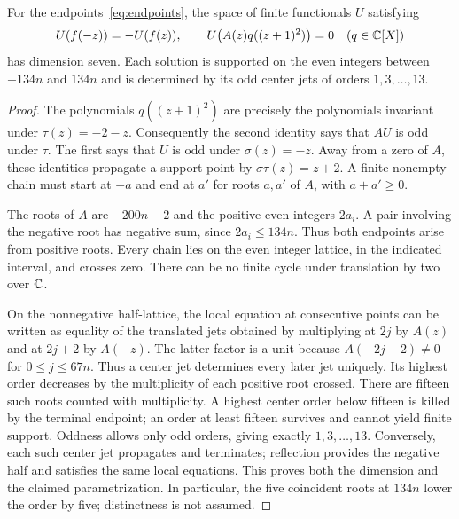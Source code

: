 \begin{proposition}\label{prop:finite-classification}
For the endpoints~\eqref{eq:endpoints}, the space of finite functionals $U$
satisfying
\begin{equation}\label{eq:finite-pearson}
 U(f(-z))=-U(f(z)),\qquad
 U\bigl(A(z)q((z+1)^2)\bigr)=0\quad(q\in\mathbb C[X])
\end{equation}
has dimension seven.  Each solution is supported on the even integers
between $-134n$ and $134n$ and is determined by its odd center jets of
orders $1,3,\ldots,13$.
\end{proposition}
\begin{proof}
The polynomials $q((z+1)^2)$ are precisely the polynomials invariant under
$\tau(z)=-2-z$.  Consequently the second identity says that $AU$ is odd
under $\tau$.  The first says that $U$ is odd under $\sigma(z)=-z$.
Away from a zero of $A$, these identities propagate a support point by
$\sigma\tau(z)=z+2$.  A finite nonempty chain must start at $-a$ and end
at $a'$ for roots $a,a'$ of $A$, with $a+a'\ge0$.

The roots of $A$ are $-200n-2$ and the positive even integers $2a_i$.
A pair involving the negative root has negative sum, since $2a_i\le134n$.
Thus both endpoints arise from positive roots.  Every chain lies on the
even integer lattice, in the indicated interval, and crosses zero.
There can be no finite cycle under translation by two over $\mathbb C$.

On the nonnegative half-lattice, the local equation at consecutive points
can be written as equality of the translated jets obtained by multiplying
at $2j$ by $A(z)$ and at $2j+2$ by $A(-z)$.  The latter factor is a unit
because $A(-2j-2)\ne0$ for $0\le j\le67n$.  Thus a center jet determines
every later jet uniquely.  Its highest order decreases by the multiplicity
of each positive root crossed.  There are fifteen such roots counted with
multiplicity.  A highest center order below fifteen is killed by the
terminal endpoint; an order at least fifteen survives and cannot yield
finite support.  Oddness allows only odd orders, giving exactly
$1,3,\ldots,13$.  Conversely, each such center jet propagates and
terminates; reflection provides the negative half and satisfies the same
local equations.  This proves both the dimension and the claimed
parametrization.  In particular, the five coincident roots at $134n$
lower the order by five; distinctness is not assumed.
\end{proof}

